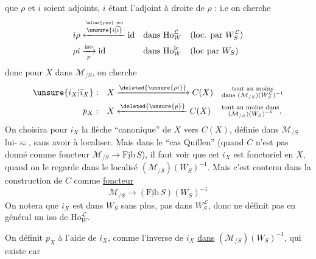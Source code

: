 que $\rho$ et $i$ soient adjoints,  $i$ étant l'adjoint à droite de $\rho$ :
i.e on cherche
\[
\begin{aligned}
i\rho &\xleftarrow{\overset{\text{\uline{pas} iso}}{\unsure{i|\widetilde{\imath}}}}\mathrm{id} &&\text{dans }\mathrm{Ho}^{\mathcal L}_W &&(\text{loc. par }W_S^{\mathcal L})\\
\rho i &\xrightarrow[p]{\mathrm{iso}}\mathrm{id} &&\text{dans }\mathrm{Ho}^{\mathrm{lc}}_W &&(\text{loc par }W_S)
\end{aligned}
\]
donc pour $X$ dans $\mathcal M_{/S}$, on cherche
\[
\begin{aligned}
\unsure{i_X|\widetilde{\imath}_X}:&\quad X\xrightarrow{\deleted{\unsure{\rho i}}} C(X) &&\substack{\text{tout au moins}\\\text{dans }(\mathcal M_{/S})(W_S^{\mathcal L})^{-1}}\\
p_X:&\quad X\xleftarrow{\deleted{\unsure{p}}} C(X) &&\substack{\text{tout au moins dans}\\(\mathcal M_{/S})(W_S)^{-1}}\text{.}
\end{aligned}
\]
On choisira pour $i_X$ la flèche ``canonique'' de $X$ vers $C(X)$, définie dans $\mathcal M_{/S}$ lui-$\eqsim$, sans avoir à localiser. Mais dans le ``cas Quillen'' (quand $C$ n'est pas donné comme foncteur $\mathcal M_{/S}\longrightarrow\underline{\mathrm{Fib}}\,S$), il faut voir que cet $i_X$ est fonctoriel en $X$, quand on le regarde dans le localisé $(\mathcal M_{/S})(W_S)^{-1}$. Mais c'est contenu dans la construction de $C$ comme \uline{foncteur}
\[
\mathcal M_{/S}\longrightarrow(\underline{\mathrm{Fib}}\,S)(W_S)^{-1}
\]
On notera que $i_X$ est dans $W_S$ sans plus, pas dans $W_S^{\mathcal L}$, donc ne définit pas en général un iso de $\mathrm{Ho}^{\mathcal L}_W$.

On définit $p_X$ à l'aide de $i_X$, comme l'inverse de $i_X$ \uline{dans} $(\mathcal M_{/S})(W_S)^{-1}$, qui existe car

